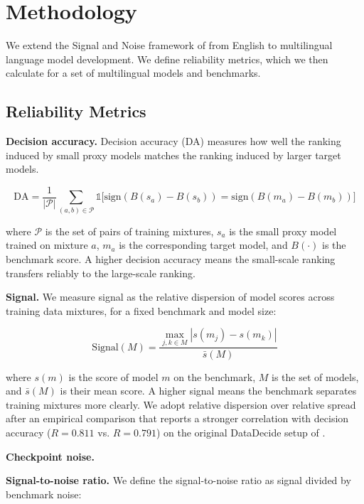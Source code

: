 \documentclass{article}
\begin{document}
\section{Methodology}
\label{sec:methodology}



We extend the Signal and Noise framework of \cite{heineman2025signalnoiseframeworkreducing} from English to multilingual language model development. We define reliability metrics, which we then calculate for a set of multilingual models and benchmarks.

\subsection{Reliability Metrics}

\textbf{Decision accuracy.} Decision accuracy (DA) measures how well the ranking induced by small proxy models matches the ranking induced by larger target models. 

$$\text{DA} = \frac{1}{|\mathcal{P}|} \sum_{(a,b) \in \mathcal{P}} \mathbb{1}\big[\text{sign}(B(s_a) - B(s_b)) = \text{sign}(B(m_a) - B(m_b))\big]$$

where $\mathcal{P}$ is the set of pairs of training mixtures, $s_a$ is the small proxy model trained on mixture $a$, $m_a$ is the corresponding target model, and $B(\cdot)$ is the benchmark score. A higher decision accuracy means the small-scale ranking transfers reliably to the large-scale ranking.



\textbf{Signal.} We measure signal as the relative dispersion of model scores across training data mixtures, for a fixed benchmark and model size:

$$\text{Signal}(M) = \frac{\max_{j,k \in M} |s(m_j) - s(m_k)|}{\bar{s}(M)}$$

where $s(m)$ is the score of model $m$ on the benchmark, $M$ is the set of models, and $\bar{s}(M)$ is their mean score. A higher signal means the benchmark separates training mixtures more clearly. We adopt relative dispersion over relative spread after an empirical comparison that reports a stronger correlation with decision accuracy ($R = 0.811$ vs. $R = 0.791$) on the original DataDecide setup of \cite{magnusson2025datadecidepredictbestpretraining}.

\textbf{Checkpoint noise.} 


\textbf{Signal-to-noise ratio.} We define the signal-to-noise ratio as signal divided by benchmark noise:
\end{document}
